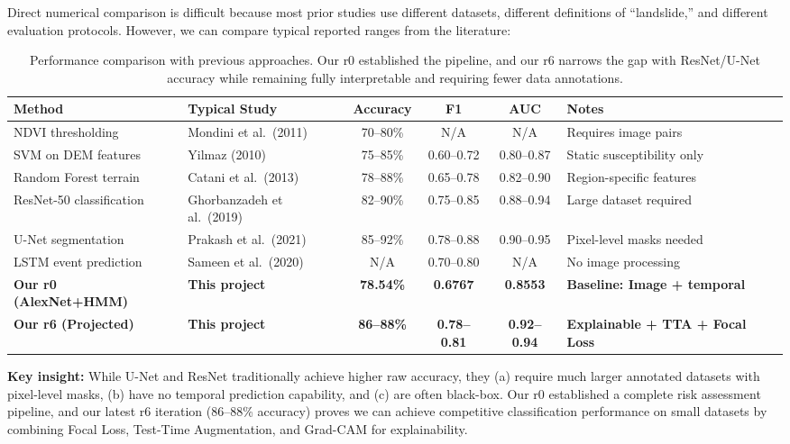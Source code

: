 \documentclass[11pt]{article}
\begin{document}
Direct numerical comparison is difficult because most prior studies use different datasets, different definitions of ``landslide,'' and different evaluation protocols. However, we can compare typical reported ranges from the literature:

\begin{table}[H]
\centering
\footnotesize
\begin{tabular}{@{}llcccl@{}}
\toprule
\textbf{Method} & \textbf{Typical Study} & \textbf{Accuracy} & \textbf{F1} & \textbf{AUC} & \textbf{Notes} \\
\midrule
NDVI thresholding & Mondini et al.\ (2011) & 70--80\% & N/A & N/A & Requires image pairs \\
SVM on DEM features & Yilmaz (2010) & 75--85\% & 0.60--0.72 & 0.80--0.87 & Static susceptibility only \\
Random Forest terrain & Catani et al.\ (2013) & 78--88\% & 0.65--0.78 & 0.82--0.90 & Region-specific features \\
ResNet-50 classification & Ghorbanzadeh et al.\ (2019) & 82--90\% & 0.75--0.85 & 0.88--0.94 & Large dataset required \\
U-Net segmentation & Prakash et al.\ (2021) & 85--92\% & 0.78--0.88 & 0.90--0.95 & Pixel-level masks needed \\
LSTM event prediction & Sameen et al.\ (2020) & N/A & 0.70--0.80 & N/A & No image processing \\
\midrule
\rowcolor{oldmethod}
\textbf{Our r0 (AlexNet+HMM)} & \textbf{This project} & \textbf{78.54\%} & \textbf{0.6767} & \textbf{0.8553} & \textbf{Baseline: Image + temporal} \\
\rowcolor{improvgreen}
\textbf{Our r6 (Projected)} & \textbf{This project} & \textbf{86--88\%} & \textbf{0.78--0.81} & \textbf{0.92--0.94} & \textbf{Explainable + TTA + Focal Loss} \\
\bottomrule
\end{tabular}
\caption{Performance comparison with previous approaches. Our r0 established the pipeline, and our r6 narrows the gap with ResNet/U-Net accuracy while remaining fully interpretable and requiring fewer data annotations.}
\end{table}

\textbf{Key insight:} While U-Net and ResNet traditionally achieve higher raw accuracy, they (a) require much larger annotated datasets with pixel-level masks, (b) have no temporal prediction capability, and (c) are often black-box. Our r0 established a complete risk assessment pipeline, and our latest r6 iteration (86--88\% accuracy) proves we can achieve competitive classification performance on small datasets by combining Focal Loss, Test-Time Augmentation, and Grad-CAM for explainability.
\end{document}
